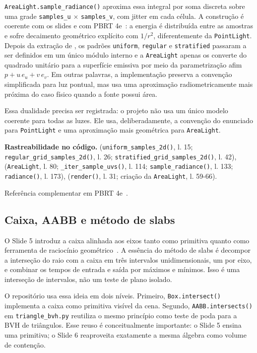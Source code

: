 \documentclass[portuguese]{sbcreviews-2025}%
\newcommand{\slidescite}[2]{\citep[pp.~#2]{#1}}
\newcommand{\pbrtsec}[1]{PBRT 4e~\citep[Se\c{c}\~ao~#1]{pharr2023pbrt}}
\begin{document}
\texttt{AreaLight.sample\_radiance()} aproxima essa integral por soma discreta sobre uma grade \texttt{samples\_u} $\times$ \texttt{samples\_v}, com jitter em cada célula. A construção é coerente com os slides e com \pbrtsec{12.4}: a energia é distribuída entre as amostras e sofre decaimento geométrico explícito com $1/r^2$, diferentemente da \texttt{PointLight}. Depois da extração de , os padrões \texttt{uniform}, \texttt{regular} e \texttt{stratified} passaram a ser definidos em um único módulo interno e a \texttt{AreaLight} apenas os converte do quadrado unitário para a superfície emissiva por meio da parametrização afim $p + u\,e_u + v\,e_v$. Em outras palavras, a implementação preserva a convenção simplificada para luz pontual, mas usa uma aproximação radiometricamente mais próxima do caso físico quando a fonte possui área.

Essa dualidade precisa ser registrada: o projeto não usa um único modelo coerente para todas as luzes. Ele usa, deliberadamente, a convenção do enunciado para \texttt{PointLight} e uma aproximação mais geométrica para \texttt{AreaLight}.

\noindent\textbf{Rastreabilidade no código.}  (\texttt{uniform\_samples\_2d()}, l. 15; \texttt{regular\_grid\_samples\_2d()}, l. 26; \texttt{stratified\_grid\_samples\_2d()}, l. 42),  (\texttt{AreaLight}, l. 80; \texttt{\_iter\_sample\_uvs()}, l. 114; \texttt{sample\_radiance()}, l. 133; \texttt{radiance()}, l. 173),  (\texttt{render()}, l. 31; criação da \texttt{AreaLight}, l. 59-66).

Referência complementar em \pbrtsec{12.4}.

\subsection{Caixa, AABB e método de slabs}
\label{sec:slide5-aabb}

O Slide 5 introduz a caixa alinhada aos eixos tanto como primitiva quanto como ferramenta de raciocínio geométrico~\slidescite{inf2608slides05}{24--25}. A essência do método de slabs é decompor a interseção do raio com a caixa em três intervalos unidimensionais, um por eixo, e combinar os tempos de entrada e saída por máximos e mínimos. Isso é uma interseção de intervalos, não um teste de plano isolado.

O repositório usa essa ideia em dois níveis. Primeiro, \texttt{Box.intersect()} implementa a caixa como primitiva visível da cena. Segundo, \texttt{AABB.intersects()} em \texttt{triangle\_bvh.py} reutiliza o mesmo princípio como teste de poda para a BVH de triângulos. Esse reuso é conceitualmente importante: o Slide 5 ensina uma primitiva; o Slide 6 reaproveita exatamente a mesma álgebra como volume de contenção.
\end{document}
